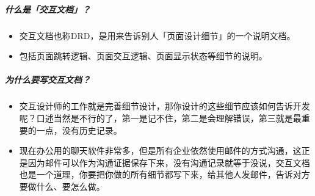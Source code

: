 \documentclass[letterpaper,10pt,english]{sphinxmanual}
\begin{document}
\subparagraph{什么是「交互文档」？}
\label{\detokenize{chapter_knowledge/static_page:id4}}\begin{itemize}
\item {} 
交互文档也称DRD，是用来告诉别人「页面设计细节」的一个说明文档。

\item {} 
包括页面跳转逻辑、页面交互逻辑、页面显示状态等细节的说明。%
\begin{footnote}[609]\sphinxAtStartFootnote
{}
%
\end{footnote}

\end{itemize}


\subparagraph{为什么要写交互文档？}
\label{\detokenize{chapter_knowledge/static_page:id5}}\begin{itemize}
\item {} 
交互设计师的工作就是完善细节设计，那你设计的这些细节应该如何告诉开发呢？口述当然是不行的了，第一是记不住，第二是会理解错误，第三就是最重要的一点，没有历史记录。

\item {} 
现在办公用的聊天软件非常多，但是所有企业依然使用邮件的方式沟通，这正是因为邮件可以作为沟通证据保存下来，没有沟通记录就等于没说，交互文档也是一个道理，你要把你做的所有细节都写下来，给其他人发邮件，告诉对方要做什么、要怎么做。

\end{itemize}
\end{document}
